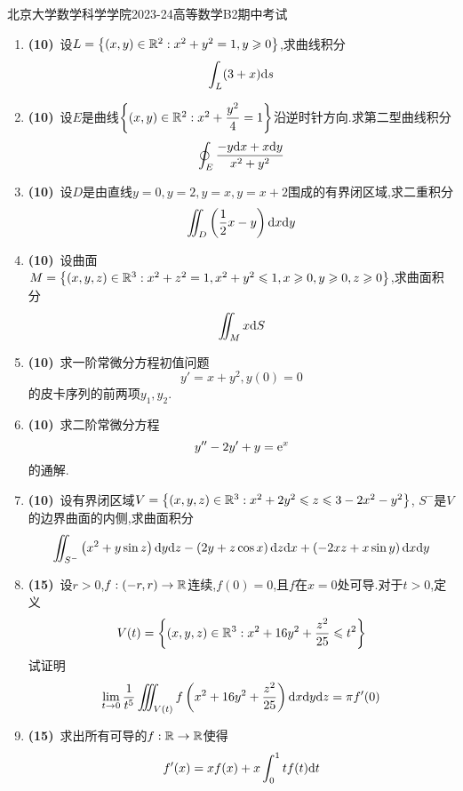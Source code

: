 \documentclass{ctexart}
\begin{document}
\pagestyle{empty}
\begin{center}\Large
    北京大学数学科学学院2023-24高等数学B2期中考试
\end{center}
\begin{enumerate}[leftmargin=*,label=\textbf{\arabic*.}]
    \item \textbf{(10)}\ 设$L=\left\{(x,y)\in\mathbb{R}^2:x^2+y^2=1,y\geqslant0\right\}$,求曲线积分
        \[\int_{L}(3+x)\mathrm{d} s\]

    \item \textbf{(10)}\ 设$E$是曲线$\left\{(x,y)\in\mathbb{R}^2:x^2+\dfrac{y^2}{4}=1\right\}$沿逆时针方向.求第二型曲线积分
        \[\oint_{E}\dfrac{-y\mathrm{d} x+x\mathrm{d} y}{x^2+y^2}\]

    \item \textbf{(10)}\ 设$D$是由直线$y=0,y=2,y=x,y=x+2$围成的有界闭区域,求二重积分
        \[\iint_D\left(\dfrac12x-y\right)\mathrm{d} x\mathrm{d} y\]

    \item \textbf{(10)}\ 设曲面$M=\left\{(x,y,z)\in\mathbb{R}^3:x^2+z^2=1,x^2+y^2\leqslant1,x\geqslant0,y\geqslant0,z\geqslant0\right\}$,求曲面积分
        \[\iint_{M}x\mathrm{d} S\]
        
    \item \textbf{(10)}\ 求一阶常微分方程初值问题
        \[y'=x+y^2,y(0)=0\]
        的皮卡序列的前两项$y_1,y_2$.

    \item \textbf{(10)}\ 求二阶常微分方程
        \[y''-2y'+y=\mathrm{e}^x\]
        的通解.

    \item \textbf{(10)}\ 设有界闭区域$V=\left\{(x,y,z)\in\mathbb{R}^3:x^2+2y^2\leqslant z\leqslant 3-2x^2-y^2\right\}$,%
        $S^-$是$V$的边界曲面的内侧,求曲面积分
        \[\iint_{S^-}\left(x^2+y\sin z\right)\mathrm{d} y\mathrm{d} z-\left(2y+z\cos x\right)\mathrm{d} z\mathrm{d} x+\left(-2xz+x\sin y\right)\mathrm{d} x\mathrm{d} y\]

    \item \textbf{(15)}\ 设$r>0$,$f:(-r,r)\to\mathbb{R}$连续,$f(0)=0$,且$f$在$x=0$处可导.对于$t>0$,定义
        \[V(t)=\left\{(x,y,z)\in\mathbb{R}^3:x^2+16y^2+\dfrac{z^2}{25}\leqslant t^2\right\}\]
        试证明
        \[\lim_{t\to0}\dfrac{1}{t^5}\iiint_{V(t)}f\left(x^2+16y^2+\dfrac{z^2}{25}\right)\mathrm{d} x\mathrm{d} y\mathrm{d} z=\pi f'(0)\]

    \item \textbf{(15)}\ 求出所有可导的$f:\mathbb{R}\to\mathbb{R}$使得
        \[f'(x)=xf(x)+x\int_0^1tf(t)\mathrm{d} t\]
    
\end{enumerate}
\end{document}
